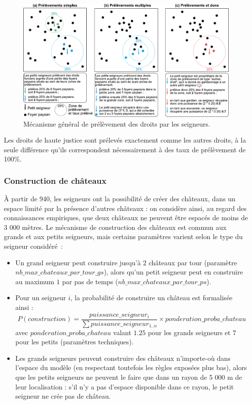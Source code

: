 \begin{figure}[H]
	\centering
	\includegraphics[width=\linewidth]{img/prelevements_droits.pdf}
	\caption{Mécanisme général de prélèvement des droits par les seigneurs.}
	\label{fig:prelevement-droits}
\end{figure}

Les droits de haute justice sont prélevés exactement comme les autres droits, à la seule différence qu'ils correspondent nécessairement à des taux de prélèvement de 100\%.

\subsubsection{Construction de châteaux \label{sssec:constru-chateaux}}


À partir de 940, les seigneurs ont la possibilité de créer des châteaux, dans un espace limité par la présence d'autres châteaux : on considère ainsi, au regard des connaissances empiriques, que deux châteaux ne peuvent être espacés de moins de 3 000 mètres.
Le mécanisme de construction des châteaux est commun aux grands et aux petits seigneurs, mais certains paramètres varient selon le type du seigneur considéré :
\begin{itemize}
	\item Un grand seigneur peut construire jusqu'à $2$ châteaux par tour (paramètre $nb\_max\_chateaux\_par\_tour\_gs$), alors qu'un petit seigneur peut en construire au maximum $1$ par pas de temps ($nb\_max\_chateaux\_par\_tour\_ps$).
	\item Pour un seigneur $i$, la probabilité de construire un château est formalisée ainsi :\\
	$$
	P \left( construction \right) = \frac{puissance\_seigneur_{i}}{\sum{puissance\_seigneur_{1..n}}} \times ponderation\_proba\_chateau
	$$
	avec $ponderation\_proba\_chateau$ valant $1.25$ pour les grands seigneurs et $7$ pour les petits (paramètres techniques).
	\item Les grands seigneurs peuvent construire des châteaux n'importe-où dans l'espace du modèle (en respectant toutefois les règles exposées plus bas), alors que les petits seigneurs ne peuvent le faire que dans un rayon de 5 000 m de leur localisation : s'il n'y a pas d'espace disponible dans ce rayon, le petit seigneur ne crée pas de château.
\end{itemize}


